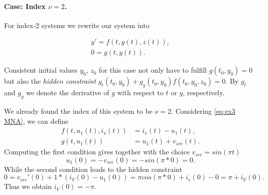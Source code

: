 \paragraph{Case: Index $\nu = 2$.}

For index-2 systems we rewrite our system into

\begin{align*}
	y' = f(t,y(t),z(t)), \\
	0 = g(t,y(t)).
\end{align*}

Consistent initial values $y_0$, $z_0$ for this case not only have to fulfill $g(t_0, y_0) = 0$ but also the \emph{hidden constraint} $g_t(t_0, y_0) + g_y(t_0, y_0)f(t_0, y_0, z_0) = 0$. By $g_t$ and $g_y$ we denote the derivative of $g$ with respect to $t$ or $y$, respectively.


\begin{example3}
	We already found the index of this system to be $\nu = 2$. Considering \eqref{eq:ex3 MNA}, we can define
	\begin{align*}
		f(t,u_1(t),i_v(t)) &= i_v(t) - u_1(t), \\
		g(t, u_1(t)) &= u_1(t) + v_{src}(t).
	\end{align*}
	Computing the first condition gives together with the choice $v_{src} = sin(\pi t)$
	\begin{displaymath}
		u_1(0) = -v_{src}(0) = -sin(\pi *0) = 0.
	\end{displaymath}
	While the second condition leads to the hidden constraint
	\begin{displaymath}
		0 = v_{src}'(0) + 1*(i_V(0)-u_1(0)) = \pi cos(\pi *0) + i_v(0) - 0 = \pi + i_V(0).
	\end{displaymath}
	Thus we obtain $i_V(0) = -\pi$.
\end{example3}
